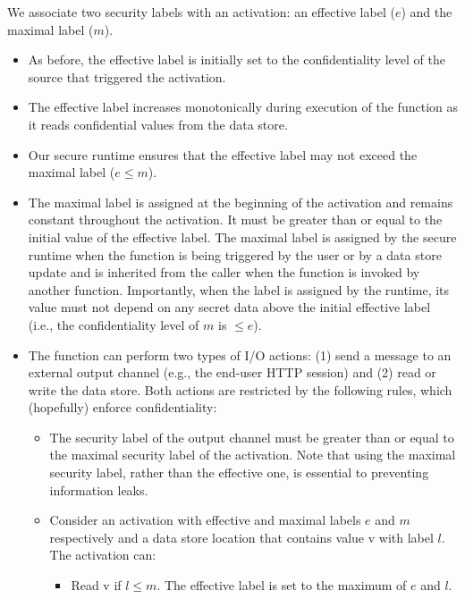 We associate two security labels with an activation: an effective label ($e$) and the maximal label ($m$).
\begin{itemize}
    \item As before, the effective label is initially set to the confidentiality level of the source that triggered the activation.

    \item The effective label increases monotonically during execution of the function as it reads confidential values from the data store.

    \item Our secure runtime ensures that the effective label may not exceed the maximal label ($e \leq m$).

    \item The maximal label is assigned at the beginning of the activation and remains constant throughout the activation. It must be greater than or equal to the initial value of the effective label. The maximal label is assigned by the secure runtime when the function is being triggered by the user or by a data store update and is inherited from the caller when the function is invoked by another function. Importantly, when the label is assigned by the runtime, its value must not depend on any secret data above the initial effective label (i.e., the confidentiality level of $m$ is $\leq e$).

    \item The function can perform two types of I/O actions: (1) send a message to an external output channel (e.g., the end-user HTTP session) and (2) read or write the data store. Both actions are restricted by the following rules, which (hopefully) enforce confidentiality:
    \begin{itemize}
        \item The security label of the output channel must be greater than or equal to the maximal security label of the activation. Note that using the maximal security label, rather than the effective one, is essential to preventing information leaks.

        \item Consider an activation with effective and maximal labels $e$ and $m$ respectively and a data store location that contains value v with label $l$. The activation can:

        \begin{itemize}
            \item Read v if $l \leq m$. The effective label is set to the maximum of $e$ and $l$.


\end{itemize}
\end{itemize}
\end{itemize}
